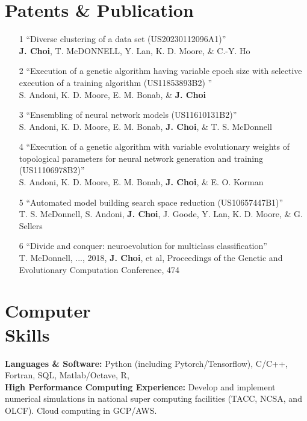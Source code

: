 \documentclass[margin,centered]{res}
\begin{document}
\begin{resume}
\section{Patents \& Publication}
\begin{enumerate}
\item[1] ``Diverse clustering of a data set (US20230112096A1)'' \\ \textbf{J. Choi}, T. McDONNELL, Y. Lan, K. D. Moore, \& C.-Y. Ho

\item[2] ``Execution of a genetic algorithm having variable epoch size with selective execution of a training algorithm (US11853893B2) '' \\ S. Andoni, K. D. Moore, E. M. Bonab, \& \textbf{J. Choi}

\item[3] ``Ensembling of neural network models (US11610131B2)'' \\ S. Andoni, K. D. Moore, E. M. Bonab, \textbf{J. Choi}, \& T. S. McDonnell 

\item[4] ``Execution of a genetic algorithm with variable evolutionary weights of topological parameters for neural network generation and training (US11106978B2)'' \\ S. Andoni, K. D. Moore, E. M. Bonab, \textbf{J. Choi}, \& E. O. Korman

\item[5] ``Automated model building search space reduction (US10657447B1)'' \\ T. S. McDonnell, S. Andoni, \textbf{J. Choi}, J. Goode, Y. Lan, K. D. Moore, \& G. Sellers

\item[6] ``Divide and conquer: neuroevolution for multiclass classification'' \\ T. McDonnell, ..., 2018, \textbf{J. Choi}, et al, Proceedings of the Genetic and Evolutionary Computation Conference, 474

\end{enumerate} 

\section{Computer \\ Skills} 
{\bf Languages \& Software:} Python (including Pytorch/Tensorflow), C/C++, Fortran, SQL, Matlab/Octave, R,\\
{\bf High Performance Computing Experience:} Develop and implement numerical simulations in national super computing facilities (TACC, NCSA, and OLCF). Cloud computing in GCP/AWS.


\end{resume}
\end{document}
